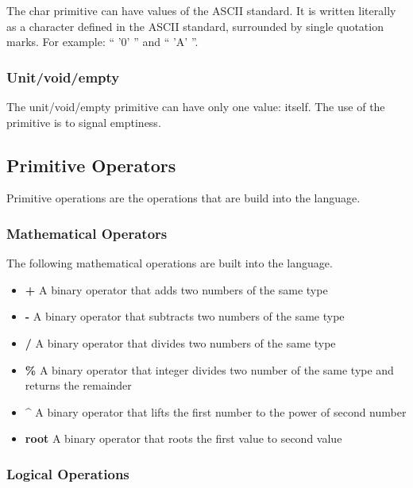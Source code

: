 The char primitive can have values of the ASCII standard. It is written literally as a character defined in the ASCII standard, surrounded by single quotation marks. For example: \enquote{ '0' } and \enquote{ 'A' }.

\subsubsection{Unit/void/empty}
\label{sec:unit/empty/void}

The unit/void/empty primitive can have only one value: itself. The use of the primitive is to signal emptiness.

\subsection{Primitive Operators}
\label{sec:primitiveOps}

Primitive operations are the operations that are build into the language.

\subsubsection{Mathematical Operators}
\label{sec:mathOps}

The following mathematical operations are built into the language.

\begin{itemize}
  \item \textbf{+} A binary operator that adds two numbers of the same type
  \item \textbf{-} A binary operator that subtracts two numbers of the same type
  \item \textbf{/} A binary operator that divides two numbers of the same type
  \item \textbf{\%} A binary operator that integer divides two number of the same type and returns the remainder
  \item \textbf{\^}  A binary operator that lifts the first number to the power of second number
  \item \textbf{root} A binary operator that roots the first value to second value
\end{itemize}


\subsubsection{Logical Operations}
\label{sec:logicOps}

